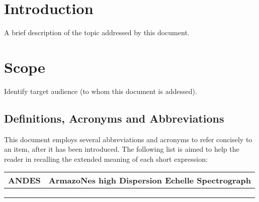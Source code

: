 \section{Introduction}
\label{sec:intro}

A brief description of the topic addressed by this document.


\section{Scope}
\label{sec:scope}

Identify target audience (to whom this document is addessed).


\subsection{Definitions, Acronyms and Abbreviations}
\label{sec:acronyms}

This document employs several abbreviations and acronyms to refer concisely to an item, after it has been introduced. The following list is aimed to help the reader in recalling the extended meaning of each short expression:

\begin{longtable}{ |l|l| }
  \hline
ANDES & ArmazoNes high Dispersion Echelle Spectrograph \\ \hline
      &                                                \\ \hline
      &                                                \\ \hline
      &                                                \\ \hline
\end{longtable}

\renewcommand\thetable{1} %
